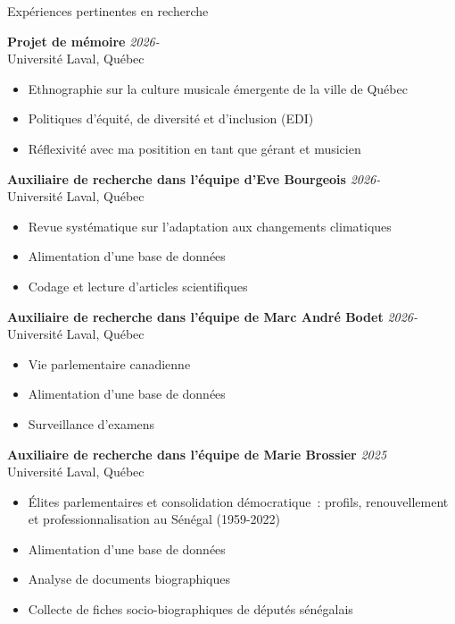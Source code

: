 \documentclass{resume} %
\begin{document}
\begin{rSection}{Expériences pertinentes en recherche}

{\bf Projet de mémoire} \hfill {\em 2026-}
\\ Université Laval, Québec
\begin{itemize}
	\vspace{-0.1cm}\item Ethnographie sur la culture musicale émergente de la ville de Québec
	\vspace{-0.3cm}\item Politiques d’équité, de diversité et d’inclusion (EDI)
	\vspace{-0.3cm}\item Réflexivité avec ma positition en tant que gérant et musicien
\end{itemize}

{\bf Auxiliaire de recherche dans l'équipe d'Eve Bourgeois} \hfill {\em 2026-}
\\ Université Laval, Québec
\begin{itemize}
	\vspace{-0.1cm}\item Revue systématique sur l’adaptation aux changements climatiques
	\vspace{-0.3cm}\item Alimentation d'une base de données
	\vspace{-0.3cm}\item Codage et lecture d'articles scientifiques
\end{itemize}

{\bf Auxiliaire de recherche dans l'équipe de Marc André Bodet} \hfill {\em 2026-}
\\ Université Laval, Québec
\begin{itemize}
	\vspace{-0.1cm}\item Vie parlementaire canadienne
	\vspace{-0.3cm}\item Alimentation d'une base de données
	\vspace{-0.3cm}\item Surveillance d'examens
\end{itemize}

{\bf Auxiliaire de recherche dans l'équipe de Marie Brossier} \hfill {\em 2025}
\\ Université Laval, Québec
\begin{itemize}
	\vspace{-0.1cm}\item Élites parlementaires et consolidation démocratique~: profils, renouvellement et professionnalisation au Sénégal (1959-2022)
	\vspace{-0.3cm}\item Alimentation d'une base de données
	\vspace{-0.3cm}\item Analyse de documents biographiques
	\vspace{-0.3cm}\item Collecte de fiches socio-biographiques de députés sénégalais
\end{itemize}


\end{rSection}
\end{document}
